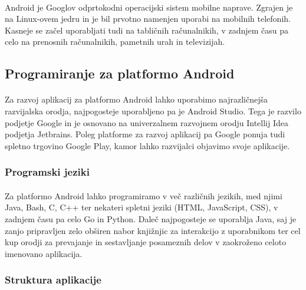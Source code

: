 \paragraph{}Android je Googlov odprtokodni\cite{android-source} operacijski sistem mobilne naprave. Zgrajen je na Linux-ovem jedru\cite{linux-kernel-wiki} in je bil prvotno namenjen uporabi na mobilnih telefonih. Kasneje se začel uporabljati tudi na tabličnih računalnikih, v zadnjem času pa celo na prenosnih računalnikih, pametnih urah in televizijah.

\subsection{Programiranje za platformo Android}
\paragraph{}Za razvoj aplikacij za platformo Android lahko uporabimo najrazličnejša razvijalska orodja, najpogosteje uporabljeno pa je Android Studio. Tega je razvilo podjetje Google in je osnovano na univerzalnem razvojnem orodju Intellij Idea\cite{intellij-idea} podjetja Jetbrains. Poleg platforme za razvoj aplikacij pa Google ponuja tudi spletno trgovino Google Play, kamor lahko razvijalci objavimo svoje aplikacije.

\subsubsection{Programski jeziki}
\paragraph{}Za platformo Android lahko programiramo v več različnih jezikih, med njimi Java, Bash, C, C++ ter nekateri spletni jeziki (HTML, JavaScript, CSS), v zadnjem času pa celo Go in Python. Daleč najpogosteje se uporablja Java, saj je zanjo pripravljen zelo obširen nabor knjižnjic za interakcijo z uporabnikom ter cel kup orodji za prevajanje in sestavljanje posameznih delov v zaokroženo celoto imenovano aplikacija.

\subsubsection{Struktura aplikacije}
